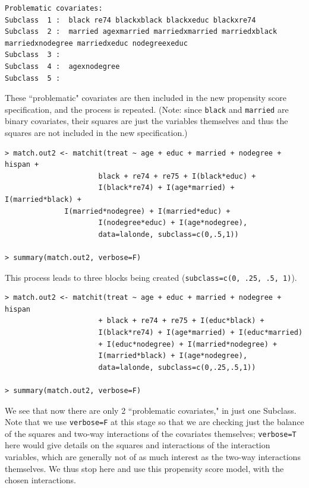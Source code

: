 \documentclass[oneside,letterpaper,titlepage]{article}
\begin{document}
\begin{verbatim}
Problematic covariates:
Subclass  1 :  black re74 blackxblack blackxeduc blackxre74
Subclass  2 :  married agexmarried marriedxmarried marriedxblack marriedxnodegree marriedxeduc nodegreexeduc
Subclass  3 :  
Subclass  4 :  agexnodegree
Subclass  5 :  
\end{verbatim}

These ``problematic" covariates are then included in the new propensity score specification, and the process is repeated.
(Note: since {\tt black} and {\tt married} are binary covariates, their squares are just the variables themselves and thus 
the squares are not included in the new specification.)

\begin{verbatim}
> match.out2 <- matchit(treat ~ age + educ + married + nodegree + hispan +
                      black + re74 + re75 + I(black*educ) +
                      I(black*re74) + I(age*married) + I(married*black) + 
		      I(married*nodegree) + I(married*educ) +
                      I(nodegree*educ) + I(age*nodegree),
                      data=lalonde, subclass=c(0,.5,1))

> summary(match.out2, verbose=F)
\end{verbatim}

This process leads to three blocks being created  ({\tt subclass=c(0, .25, .5, 1)}).

\begin{verbatim}
> match.out2 <- matchit(treat ~ age + educ + married + nodegree + hispan
                      + black + re74 + re75 + I(educ*black) +
                      I(black*re74) + I(age*married) + I(educ*married)
                      + I(educ*nodegree) + I(married*nodegree) +
                      I(married*black) + I(age*nodegree),
                      data=lalonde, subclass=c(0,.25,.5,1))

> summary(match.out2, verbose=F)
\end{verbatim}

We see that now there are only 2 ``problematic covariates," in just one Subclass.  Note that we use {\tt verbose=F}
at this stage so that we are checking just the balance of the squares and two-way interactions of the covariates themselves; 
{\tt verbose=T} here would give details on the squares and interactions of the interaction variables, which are generally 
not of as much interest as the two-way interactions themselves.  We thus stop here and use this propensity score model,
with the chosen interactions.
\end{document}
